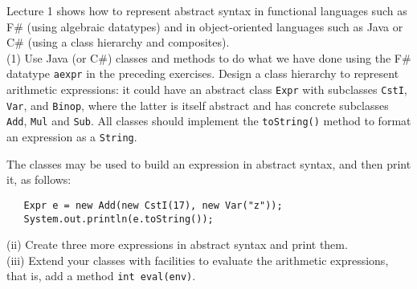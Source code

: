 \documentclass[a4paper]{article}
\begin{document}
\begin{exercise}\label{exer-datatype-java}
{\color{red}{This exercise uses Java/C\# - I haven't translated this as I'm unsure whether the exercise is necessary.}}  
Lecture 1 shows how to represent abstract syntax in functional
languages such as F\# (using algebraic datatypes) and in
object-oriented languages such as Java or C\# 
(using a class hierarchy and composites).\\

\noindent
(1) Use Java (or C\#) classes and methods to do what we have done
using the F\# datatype \texttt{aexpr} in the preceding exercises.
Design a class hierarchy to represent arithmetic expressions: it could
have an abstract class \texttt{Expr} with subclasses \texttt{CstI},
\texttt{Var}, and \texttt{Binop}, where the latter is itself abstract
and has concrete subclasses \texttt{Add}, \texttt{Mul} and
\texttt{Sub}\@.  All classes should implement the \texttt{toString()}
method to format an expression as a \texttt{String}.

The classes may be used to build an expression in abstract syntax, and
then print it, as follows:

{\codesetup\begin{verbatim}
   Expr e = new Add(new CstI(17), new Var("z"));
   System.out.println(e.toString());
\end{verbatim}}

\noindent
(ii) Create three more expressions in abstract syntax and print them.\\

\noindent
(iii) Extend your classes with facilities to evaluate the arithmetic
expressions, that is, add a method \texttt{int eval(env)}.

\end{exercise}
\end{document}
